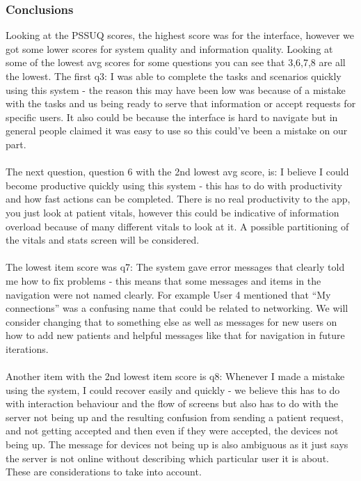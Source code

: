 \documentclass[12pt]{article}
\begin{document}
{\subsubsection{Conclusions}
Looking at the PSSUQ scores, the highest score was for the interface, however we got some lower scores for system quality and information quality. Looking at some of the lowest avg scores for some questions you can see that 3,6,7,8 are all the lowest. The first  q3: I was able to complete the tasks and scenarios quickly using this system  - the reason this may have been low was because of a mistake with the tasks and us being ready to serve that information or accept requests for specific users. It also could be because the interface is hard to navigate but in general people claimed it was easy to use so this could’ve been a mistake on our part. \\
\\
The next question, question 6 with the 2nd lowest avg score, is: I believe I could become productive quickly using this system - this has to do with productivity and how fast actions can be completed. There is no real productivity to the app, you just look at patient vitals, however this could be indicative of information overload because of many different vitals to look at it. A possible partitioning of the vitals and stats screen will be considered. \\
\\
The lowest item score was q7: The system gave error messages that clearly told me how to fix problems - this means that some messages and items in the navigation were not named clearly. For example User 4 mentioned that “My connections” was a confusing name that could be related to networking. We will consider changing that to something else as well as messages for new users on how to add new patients and helpful messages like that for navigation in future iterations. \\
\\
Another item with the 2nd lowest item score is q8: Whenever I made a mistake using the system, I could recover easily and quickly - we believe this has to do with interaction behaviour and the flow of screens but also has to do with the server not being up and the resulting confusion from sending a patient request, and not getting accepted and then even if they were accepted, the devices not being up. The message for devices not being up is also ambiguous as it just says the server is not online without describing which particular user it is about. These are considerations to take into account. \\
}
\end{document}
